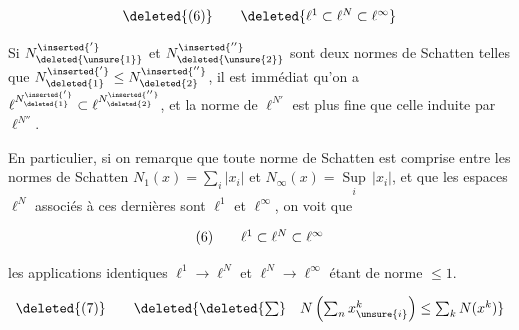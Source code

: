 \reversemarginpar
{}
\normalmarginpar



\[
\begin{array}{@{}l@{\qquad}l@{}}
\deleted{(6)} & \deleted{\ell^1\subset\ell^N\subset\ell^\infty}
\end{array}
\]


Si $N_{\deleted{\unsure{1}}}^{\inserted{'}}$ et $N_{\deleted{\unsure{2}}}^{\inserted{''}}$ sont deux normes de Schatten telles que $N_{\deleted{1}}^{\inserted{'}}\leq N_{\deleted{2}}^{\inserted{''}}$, il est immédiat qu'on a $\ell^{N_{\deleted{1}}^{\inserted{'}}}\subset\ell^{N_{\deleted{2}}^{\inserted{''}}}$, et la norme de $\ell^{N'}$  est plus fine que celle induite par $\ell^{N''}$.

 En particulier, si on remarque que toute norme de Schatten est comprise entre les normes de Schatten $N_1(x)=\sum_i |x_i|$ et $N_\infty(x)=\underset{i}{\operatorname{Sup}}\,|x_i|$, et que les espaces $\ell^N$ associés à ces dernières sont  $\ell^1$ et $\ell^\infty$,  on voit que

\[
\begin{array}{@{}l@{\qquad}l@{}}
(6) & \ell^1\subset\ell^N\subset\ell^\infty
\end{array}
\]

les applications identiques  $\ell^1\to\ell^N$ et $\ell^N\to\ell^\infty$ étant de norme $\leq 1$.


\[
\begin{array}{@{}l@{\qquad}l@{}}
\deleted{(7)} & \deleted{\deleted{\sum}\quad N\left(\sum_n x_{\unsure{i}}^{k}\right)\leq\sum_k N(x^k)}
\end{array}
\]

\reversemarginpar{}\normalmarginpar
{}

